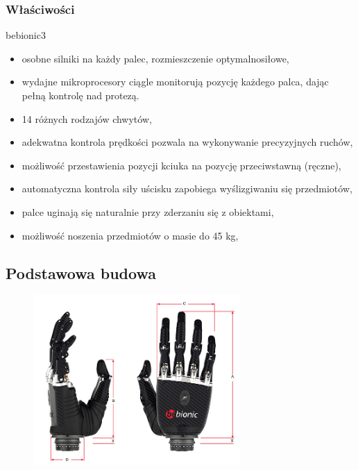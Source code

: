 \documentclass[8pt]{beamer}
\begin{document}
	\begin{frame}%
	\frametitle{Właściwości}
		bebionic3
		\begin{itemize}[<+->]
	\item osobne silniki na każdy palec, rozmieszczenie optymalnosiłowe,
	\item wydajne mikroprocesory ciągle monitorują pozycję każdego palca, dając pełną kontrolę nad protezą.
	\item 14 różnych rodzajów chwytów,
	\item adekwatna kontrola prędkości pozwala na wykonywanie precyzyjnych ruchów,
	\item możliwość przestawienia pozycji kciuka na pozycję przeciwstawną (ręczne),
	\item automatyczna kontrola siły uścisku zapobiega wyślizgiwaniu się przedmiotów,
	\item palce uginają się naturalnie przy zderzaniu się z obiektami,
	\item możliwość noszenia przedmiotów o masie do 45 kg,
		\end{itemize}

	\end{frame}

	\subsection{Podstawowa budowa}
	\begin{frame}
	\begin{center}
				\begin{figure}
					\includegraphics[width=0.7\textwidth]{graphics/bebionic_dimentions.jpg}
					\label{graph:grasp}	
					\caption{ \cite{bebionic}}
				\end{figure}
			\end{center}
	\end{frame}		
\end{document}
